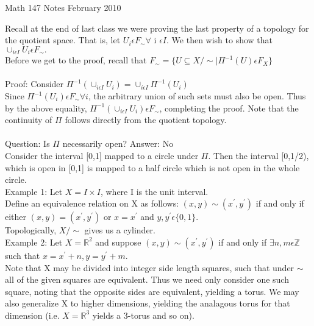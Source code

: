 \documentclass{article}
\begin{document}
\begin{center}
Math 147 Notes
 February 2010
\end{center}
Recall at the end of last class we were proving the last property of a topology for the quotient space.  That is, let $U_{i} \epsilon F_{\sim} \forall$ i $\epsilon I. $ We then wish to show that $\cup_{i \epsilon I} U_{i}\epsilon F_{\sim}.$
\\Before we get to the proof, recall that $F_{\sim} = \{U \subseteq X/\sim | \Pi^{-1}(U) \epsilon F_{X} \}$
\\
\\
Proof: Consider $\Pi^{-1}(\cup_{i \epsilon I}U_{i}) = \cup_{i \epsilon I} \Pi^{-1}(U_{i})$
\\
Since $\Pi^{-1}(U_{i}) \epsilon F_{\sim} \forall i$, the arbitrary union of such sets must also be open.  Thus by the above equality, $\Pi^{-1}(\cup_{i \epsilon I}U_{i}) \epsilon F_{\sim}$, completing the proof.  Note that the continuity of $\Pi$ follows directly from the quotient topology.
\\
\\
Question: Is $\Pi$ necessarily open?
Answer: No
\\
Consider the interval [0,1] mapped to a circle under $\Pi$.  Then the interval [0,1/2), which is open in [0,1] is mapped to a half circle which is not open in the whole circle. 
\vspace{40 mm}
\\
Example 1: Let $X=I \times I$, where I is the unit interval.
\\ Define an equivalence relation on X as follows: $(x,y)\sim(x^{'},y^{'})$ if and only if either $(x,y)=(x^{'},y^{'})$ or $x=x^{'}$ and $y,y^{'} \epsilon \{0,1\}$.
\\ Topologically, $X/\sim$ gives us a cylinder.
\vspace{40 mm}
\\ 
Example 2: Let $X = \mathbb{R}^{2}$ and suppose $(x,y)\sim(x^{'},y^{'})$ if and only if $\exists n,m \epsilon \mathbb{Z}$ such that $x = x^{'} + n, y = y^{'} + m$.  
\\Note that X may be divided into integer side length squares, such that under $\sim$ all of the given squares are equivalent.  Thus we need only consider one such square, noting that the opposite sides are equivalent, yielding a torus.  We may also generalize X to higher dimensions, yielding the analagous torus for that dimension (i.e. $X = \mathbb{R}^{3}$ yields a 3-torus and so on).
\vspace{40 mm}
\end{document}
